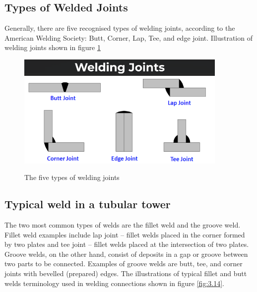 { %

\subsection{Types of Welded Joints}
 Generally, there are five recognised types of welding joints, according to the American Welding Society: Butt, Corner, Lap, Tee, and edge joint. Illustration of welding joints shown in figure \ref{fig:3.13}


\begin{figure}[htp]
    \centering
    \includegraphics[width=4in]{Figures/welding-joints-types.png}
    \caption{The five types of welding joints}
    \cite{tvm@2017_2017}
    \label{fig:3.13}
\end{figure}

\subsection{Typical weld in a tubular tower}
The two most common types of welds are the fillet weld and the groove weld. Fillet weld examples include lap joint – fillet welds placed in the corner formed by two plates and tee joint – fillet welds placed at the intersection of two plates. Groove welds, on the other hand, consist of deposits in a gap or groove between two parts to be connected. Examples of groove welds are butt, tee, and corner joints with bevelled (prepared) edges. The illustrations of typical fillet and butt welds terminology used in welding connections shown in figure \ref{fig:3.14}.

}
